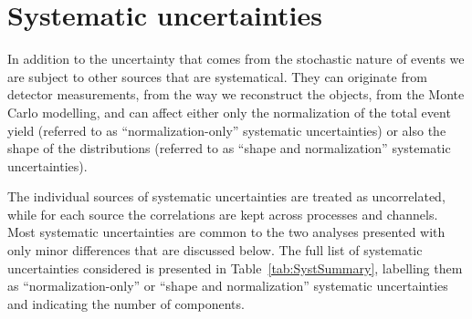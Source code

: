 


\section{Systematic uncertainties}\label{sec:systematics}

In addition to the uncertainty that comes from the stochastic nature
of events we are subject to other sources that are systematical. 
They can originate from
detector measurements, from the way we reconstruct the objects, from the Monte
Carlo modelling, and can affect either only the normalization of the total event
yield (referred to as ``normalization-only'' systematic uncertainties) or also the shape 
of the distributions (referred to as ``shape and normalization'' systematic uncertainties).

The individual sources of systematic uncertainties are treated as uncorrelated, while
for each source the correlations are 
kept across processes and channels. Most systematic uncertainties
are common to the two analyses presented with only minor differences
that are discussed below.
The full list of systematic uncertainties considered is presented in 
Table~\ref{tab:SystSummary}, labelling them as  ``normalization-only'' 
or ``shape and normalization'' systematic uncertainties and indicating the number of components.


